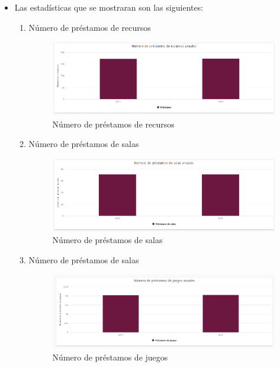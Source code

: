 \begin{itemize}
	\item  Las estadísticas que se mostraran son las siguientes:
	\begin{enumerate}
		
		\item Número de préstamos de recursos
		\begin{figure}[hbtp]
	\includegraphics[scale=0.7]{images/Interfaz/IUGS15_recursosAnos.PNG}
	\caption{Número de préstamos de recursos}
	\end{figure}
	
	\item Número de préstamos de salas
	\begin{figure}[hbtp]
	\includegraphics[scale=0.7]{images/Interfaz/IUGS15_salasAnos.PNG}
	\caption{Número de préstamos de salas}
	\end{figure}
	
	\item Número de préstamos de salas
	\begin{figure}[hbtp]
	\includegraphics[scale=0.7]{images/Interfaz/IUGS15_juegosAnos.PNG}
	\caption{Número de préstamos de juegos}
	\end{figure}
	

\end{enumerate}
\end{itemize}
